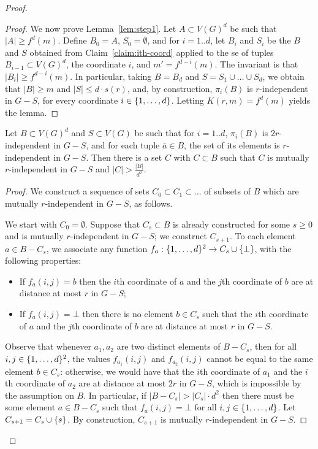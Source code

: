 \begin{proof}
\begin{proof}
We now prove Lemma~\ref{lem:step1}.
Let $A\subset V(G)^d$ be such that $|A|\ge f^d(m)$. 
Define $B_0=A$, $S_0=\emptyset$, and for $i=1..d$,
let $B_{i}$ and $S_i$ be the $B$ and $S$ obtained from  Claim~\ref{claim:ith-coord} applied to the se of tuples $B_{i-1}\subset V(G)^d$, the coordinate $i$, and $m'=f^{d-i}(m)$.  The invariant is that $|B_i|\ge f^{d-i}(m)$.
In particular, 
taking $B=B_d$ and $S=S_1\cup\ldots \cup S_d$, we obtain that $|B|\ge m$ and $|S|\le d\cdot s(r)$, and, by construction, $\pi_i(B)$
is $r$-independent in $G-S$, for every coordinate $i\in\{1,\ldots,d\}$. Letting $K(r,m)=f^d(m)$ yields the lemma.
\end{proof}


\begin{lemma}\label{lem:step2}
	Let $B\subset V(G)^d$ and $S\subset V(G)$ be such that for  $i=1..d$,
	$\pi_i(B)$ is $2r$-independent in $G-S$, and for each tuple $\bar a\in B$, the set of its elements is $r$-independent in $G-S$.  
	Then there is a set $C$ with $C\subset B$ 
	such that $C$ is mutually $r$-independent in $G-S$
	and $|C|> \frac{|B|}{d^2}$.
\end{lemma}
\begin{proof}
We construct a sequence of sets $C_0\subset C_1\subset \ldots$ of subsets of $B$ which are mutually $r$-independent in $G-S$, as follows.

We start with $C_0=\emptyset$. Suppose that $C_s\subset B$ is 
 already constructed for some $s\ge 0$
 and is mutually $r$-independent in $G-S$; we construct $C_{s+1}$.  To each element $a\in B-C_s$,
we associate any function $f_a:\{1,\ldots,d\}^2\to C_s\cup \{\bot\}$,
with the following properties:
\begin{itemize}
	\item If $f_a(i,j)=b$ then the $i$th coordinate of $a$
	and the $j$th coordinate of $b$ are at distance at most $r$
	in $G-S$;
	\item If $f_a(i,j)=\bot$ then there is no element $b\in C_s$ 
	such that the $i$th coordinate of $a$ and the $j$th coordinate of $b$ are at distance at most $r$ in $G-S$.	
\end{itemize}
Observe that whenever $a_1, a_2$ are two distinct elements of $B-C_s$,
then for all $i,j\in \{1,\ldots,d\}^2$, the values $f_{a_1}(i,j)$ and $f_{a_2}(i,j)$
cannot be equal to the same element $b\in C_s$:
otherwise, we would have that the $i$th coordinate of $a_1$
and the $i$th coordinate of $a_2$ are at distance at most $2r$
in $G-S$, which is impossible by the assumption on $B$.
In particular, if $|B-C_s|> |C_s|\cdot d^2$
then there must be some element  $a\in B-C_s$  
such that $f_a(i,j)=\bot$  for all $i,j\in\{1,\ldots,d\}$.
Let $C_{s+1}=C_s\cup \{s\}$.
By construction, $C_{s+1}$ is mutually $r$-independent in $G-S$.


\end{proof}
\end{proof}
